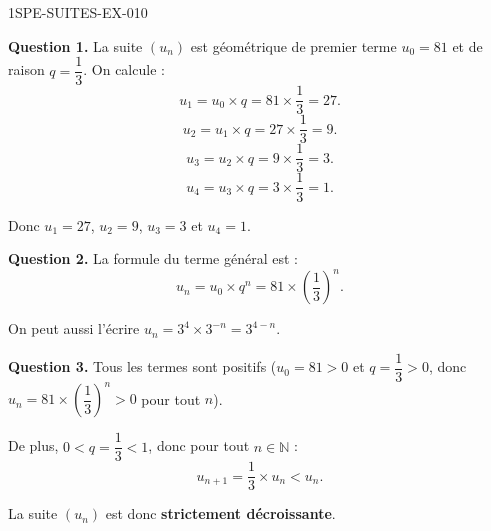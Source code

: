 \begin{corrige}{1SPE-SUITES-EX-010}


\textbf{Question 1.} La suite $(u_n)$ est géométrique de premier terme $u_0 = 81$ et de raison $q = \dfrac{1}{3}$. On calcule :
\[
u_1 = u_0 \times q = 81 \times \frac{1}{3} = 27.
\]
\[
u_2 = u_1 \times q = 27 \times \frac{1}{3} = 9.
\]
\[
u_3 = u_2 \times q = 9 \times \frac{1}{3} = 3.
\]
\[
u_4 = u_3 \times q = 3 \times \frac{1}{3} = 1.
\]

Donc $u_1 = 27$, $u_2 = 9$, $u_3 = 3$ et $u_4 = 1$.


\textbf{Question 2.} La formule du terme général est :
\[
u_n = u_0 \times q^n = 81 \times \left(\frac{1}{3}\right)^n.
\]

On peut aussi l'écrire $u_n = 3^4 \times 3^{-n} = 3^{4-n}$.


\textbf{Question 3.} Tous les termes sont positifs ($u_0 = 81 > 0$ et $q = \dfrac{1}{3} > 0$, donc $u_n = 81 \times \left(\dfrac{1}{3}\right)^n > 0$ pour tout $n$).

De plus, $0 < q = \dfrac{1}{3} < 1$, donc pour tout $n \in \mathbb{N}$ :
\[
u_{n+1} = \frac{1}{3} \times u_n < u_n.
\]

La suite $(u_n)$ est donc \textbf{strictement décroissante}.

\end{corrige}
